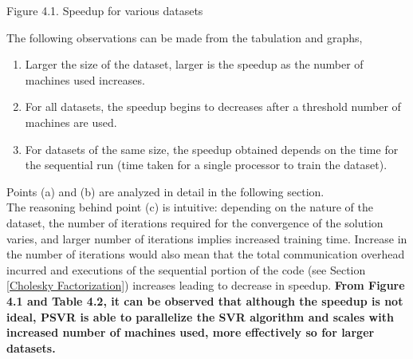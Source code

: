 \documentclass[12pt]{article}
\begin{document}
\newline
\centerline{Figure 4.1. Speedup for various datasets}
\newline\newline
The following observations can be made from the tabulation and graphs,
\begin{enumerate}[label=(\alph*)]
\item Larger the size of the dataset, larger is the speedup as the number of machines used increases.
\item For all datasets, the speedup begins to decreases after a threshold number of machines are used.
\item For datasets of the same size, the speedup obtained depends on the time for the sequential run (time taken for a single processor to train the dataset).
\end{enumerate}
Points (a) and (b) are analyzed in detail in the following section.\\
The reasoning behind point (c) is intuitive: depending on the nature of the dataset, the number of iterations required for the convergence of the solution varies, and larger number of iterations implies increased training time. Increase in the number of iterations would also mean that the total communication overhead incurred and executions of the sequential portion of the code (see Section \ref{Cholesky Factorization}) increases leading to decrease in speedup.
\newline\newline
{\bf From Figure 4.1 and Table 4.2, it can be observed that although the speedup is not ideal, PSVR is able to parallelize the SVR algorithm and scales with increased number of machines used, more effectively so for larger datasets.}
\end{document}
